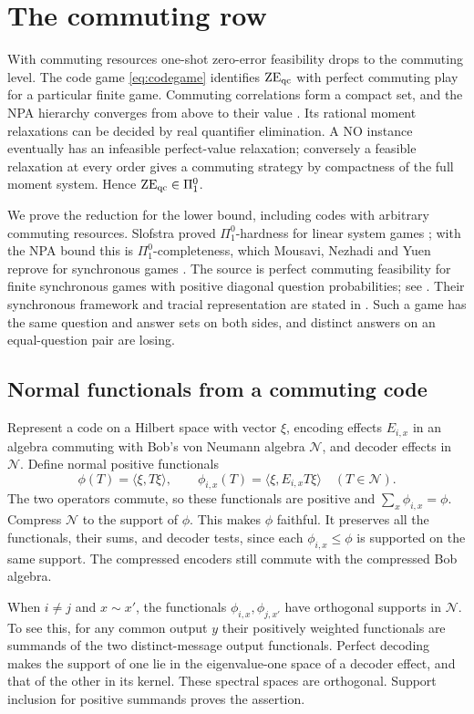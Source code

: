 \section{The commuting row}\label{sec:commuting}
With commuting resources one-shot zero-error feasibility drops to the commuting level. The code game \eqref{eq:codegame} identifies $\mathrm{ZE}_{\mathrm{qc}}$ with perfect commuting play for a particular finite game. Commuting correlations form a compact set, and the NPA hierarchy converges from above to their value \cite{NPA}. Its rational moment relaxations can be decided by real quantifier elimination. A NO instance eventually has an infeasible perfect-value relaxation; conversely a feasible relaxation at every order gives a commuting strategy by compactness of the full moment system. Hence $\mathrm{ZE}_{\mathrm{qc}}\in\Pi^0_1$.

We prove the reduction for the lower bound, including codes with arbitrary commuting resources. Slofstra proved $\Pi^0_1$-hardness for linear system games \cite{Slofstra}; with the NPA bound this is $\Pi^0_1$-completeness, which Mousavi, Nezhadi and Yuen reprove for synchronous games \cite[Theorem~6.4]{MNY}. The source is perfect commuting feasibility for finite synchronous games with positive diagonal question probabilities; see \cite[Theorem~6.4 and Section~1.3]{MNY}. Their synchronous framework and tracial representation are stated in \cite[Theorem~1.6]{MNY}. Such a game has the same question and answer sets on both sides, and distinct answers on an equal-question pair are losing.

\subsection{Normal functionals from a commuting code}
Represent a code on a Hilbert space with vector $\xi$, encoding effects $E_{i,x}$ in an algebra commuting with Bob's von Neumann algebra $\mathcal N$, and decoder effects in $\mathcal N$. Define normal positive functionals
\[
 \phi(T)=\langle\xi,T\xi\rangle,\qquad
 \phi_{i,x}(T)=\langle\xi,E_{i,x}T\xi\rangle\quad(T\in\mathcal N).
\]
The two operators commute, so these functionals are positive and $\sum_x\phi_{i,x}=\phi$. Compress $\mathcal N$ to the support of $\phi$. This makes $\phi$ faithful. It preserves all the functionals, their sums, and decoder tests, since each $\phi_{i,x}\leq\phi$ is supported on the same support. The compressed encoders still commute with the compressed Bob algebra.

When $i\ne j$ and $x\sim x'$, the functionals $\phi_{i,x},\phi_{j,x'}$ have orthogonal supports in $\mathcal N$. To see this, for any common output $y$ their positively weighted functionals are summands of the two distinct-message output functionals. Perfect decoding makes the support of one lie in the eigenvalue-one space of a decoder effect, and that of the other in its kernel. These spectral spaces are orthogonal. Support inclusion for positive summands proves the assertion.


